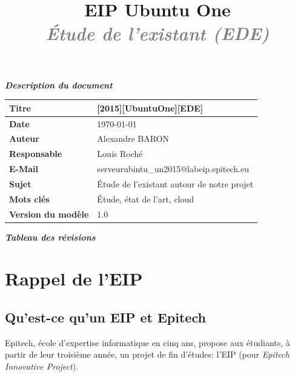 \documentclass[12pt]{report}
\title{
	\huge{\textbf{\textcolor{epiBlue}{EIP Ubuntu One} } }\\
	\Large{\textbf{\emph{\textcolor{gray}{Étude de l'existant (EDE)} } } }
}
\newcommand{\rowstyle}[1]{\gdef\currentrowstyle{#1}%
  #1\ignorespaces
}
\newcommand{\DocTitle}{[2015][UbuntuOne][EDE]}
\begin{document}
\maketitle

\thispagestyle{empty}
\vspace*{10mm}
\textbf{\emph{\textcolor{epiBlue}{Description du document} } }\\

\begin{tabular}{|>{\columncolor[gray]{0.85}\color{epiBlue} \bfseries } l|l|}
\hline
	Titre & \DocTitle\\
\hline
	Date & \dashDate\today \\
\hline
	Auteur & Alexandre BARON\\
\hline
	Responsable & Louis Roché\\
\hline
	E-Mail & serveurubintu\_un2015@labeip.epitech.eu\\
\hline
	Sujet & Étude de l'existant autour de notre projet\\
\hline
	Mots clés & Étude, état de l'art, cloud\\
\hline
	Version du modèle & 1.0\\
\hline
\end{tabular}
\vspace*{10mm}

\textbf{\emph{\textcolor{epiBlue}{Tableau des révisions} } }\\



\tableofcontents
\thispagestyle{empty}

\chapter{Rappel de l'EIP}
\setcounter{page}{1} %

\section{Qu'est-ce qu'un EIP et Epitech}
Epitech, école d'expertise informatique en cinq ans, propose aux étudiants, à partir de leur troisième année, un projet de fin d'études: l'EIP (pour \emph{Epitech Innovative Project}).\\
\end{document}
